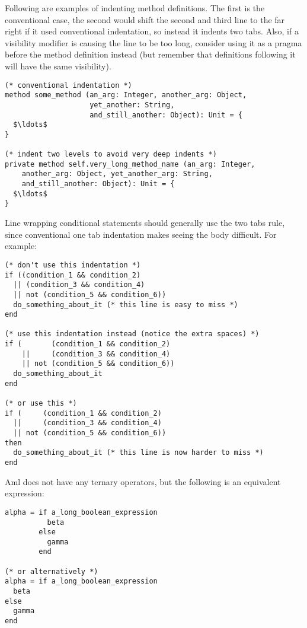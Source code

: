 \example Following are examples of indenting method definitions. The first is the conventional case, the second would shift the second and third line to the far right if it used conventional indentation, so instead it indents two tabs. Also, if a visibility modifier is causing the line to be too long, consider using it as a pragma before the method definition instead (but remember that definitions following it will have the same visibility). 

\begin{lstlisting}
(* conventional indentation *)
method some_method (an_arg: Integer, another_arg: Object, 
                    yet_another: String,
                    and_still_another: Object): Unit = {
  $\ldots$
}

(* indent two levels to avoid very deep indents *)
private method self.very_long_method_name (an_arg: Integer,
    another_arg: Object, yet_another_arg: String, 
    and_still_another: Object): Unit = {
  $\ldots$
}
\end{lstlisting}

\example Line wrapping conditional statements should generally use the two tabs rule, since conventional one tab indentation makes seeing the body difficult. For example: 

\begin{lstlisting}
(* don't use this indentation *)
if ((condition_1 && condition_2)
  || (condition_3 && condition_4)
  || not (condition_5 && condition_6))
  do_something_about_it (* this line is easy to miss *)
end

(* use this indentation instead (notice the extra spaces) *)
if (       (condition_1 && condition_2)
    ||     (condition_3 && condition_4)
    || not (condition_5 && condition_6))
  do_something_about_it
end

(* or use this *)
if (     (condition_1 && condition_2)
  ||     (condition_3 && condition_4)
  || not (condition_5 && condition_6))
then
  do_something_about_it (* this line is now harder to miss *)
end
\end{lstlisting}

\example Aml does not have any ternary operators, but the following is an equivalent expression:

\begin{lstlisting}
alpha = if a_long_boolean_expression
          beta
        else
          gamma
        end

(* or alternatively *)
alpha = if a_long_boolean_expression
  beta
else
  gamma
end
\end{lstlisting}





